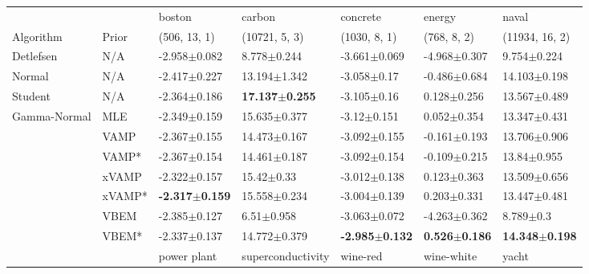 \begin{tabular}{lllllll}
\toprule
             &       &                     boston &                     carbon &                   concrete &                    energy &                      naval \\
Algorithm & Prior& (506, 13, 1)& (10721, 5, 3)& (1030, 8, 1)& (768, 8, 2)& (11934, 16, 2)\\
\midrule
Detlefsen & N/A &           -2.958$\pm$0.082 &            8.778$\pm$0.244 &           -3.661$\pm$0.069 &          -4.968$\pm$0.307 &            9.754$\pm$0.224 \\
Normal & N/A &           -2.417$\pm$0.227 &           13.194$\pm$1.342 &            -3.058$\pm$0.17 &          -0.486$\pm$0.684 &           14.103$\pm$0.198 \\
Student & N/A &           -2.364$\pm$0.186 &  \textbf{17.137$\pm$0.255} &            -3.105$\pm$0.16 &           0.128$\pm$0.256 &           13.567$\pm$0.489 \\
Gamma-Normal & MLE &           -2.349$\pm$0.159 &           15.635$\pm$0.377 &            -3.12$\pm$0.151 &           0.052$\pm$0.354 &           13.347$\pm$0.431 \\
             & VAMP &           -2.367$\pm$0.155 &           14.473$\pm$0.167 &           -3.092$\pm$0.155 &          -0.161$\pm$0.193 &           13.706$\pm$0.906 \\
             & VAMP* &           -2.367$\pm$0.154 &           14.461$\pm$0.187 &           -3.092$\pm$0.154 &          -0.109$\pm$0.215 &            13.84$\pm$0.955 \\
             & xVAMP &           -2.322$\pm$0.157 &             15.42$\pm$0.33 &           -3.012$\pm$0.138 &           0.123$\pm$0.363 &           13.509$\pm$0.656 \\
             & xVAMP* &  \textbf{-2.317$\pm$0.159} &           15.558$\pm$0.234 &           -3.004$\pm$0.139 &           0.203$\pm$0.331 &           13.447$\pm$0.481 \\
             & VBEM &           -2.385$\pm$0.127 &             6.51$\pm$0.958 &           -3.063$\pm$0.072 &          -4.263$\pm$0.362 &              8.789$\pm$0.3 \\
             & VBEM* &           -2.337$\pm$0.137 &           14.772$\pm$0.379 &  \textbf{-2.985$\pm$0.132} &  \textbf{0.526$\pm$0.186} &  \textbf{14.348$\pm$0.198} \\
\midrule
             &       &                power plant &          superconductivity &                  wine-red &                 wine-white &                      yacht \\

\end{tabular}
